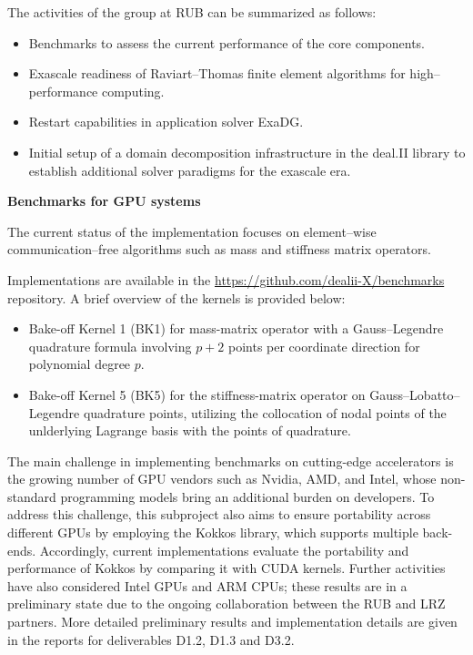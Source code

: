 \documentclass[a4paper,12pt, numbers]{article}
\begin{document}
The activities of the group at RUB can be summarized as follows:
\begin{itemize}
	\item Benchmarks to assess the current performance of the core components.
	\item Exascale readiness of Raviart--Thomas finite element algorithms for high--performance computing.
	\item Restart capabilities in application solver ExaDG.
	\item Initial setup of a domain decomposition infrastructure in the deal.II library to establish additional solver paradigms for the exascale era.
\end{itemize}



\noindent\textbf{Benchmarks for GPU systems}

The current status of the implementation focuses on element--wise communication--free algorithms such as mass and stiffness matrix operators. 

Implementations are available in the \url{https://github.com/dealii-X/benchmarks} repository. A brief overview of the kernels is provided below:
\begin{itemize}
	\item Bake-off Kernel 1 (BK1) for mass-matrix operator with a Gauss--Legendre quadrature formula involving $p+2$ points per coordinate direction for polynomial degree $p$.
	\item Bake-off Kernel 5 (BK5) for the stiffness-matrix operator on Gauss--Lobatto--Legendre quadrature points, utilizing the collocation of nodal points of the unlderlying Lagrange basis with the points of quadrature.
\end{itemize}

The main challenge in implementing benchmarks on cutting-edge accelerators is the growing number of GPU vendors such as Nvidia, AMD, and Intel, whose non-standard programming models bring an additional burden on developers. To address this challenge, this subproject also aims to ensure portability across different GPUs by employing the Kokkos library, which supports multiple back-ends. Accordingly, current implementations evaluate the portability and performance of Kokkos by comparing it with CUDA kernels.
Further activities have also considered Intel GPUs and ARM CPUs; these results
are in a preliminary state due to the ongoing collaboration between the RUB
and LRZ partners. More detailed preliminary results and implementation details are given in the reports for deliverables D1.2, D1.3 and D3.2.
\end{document}
